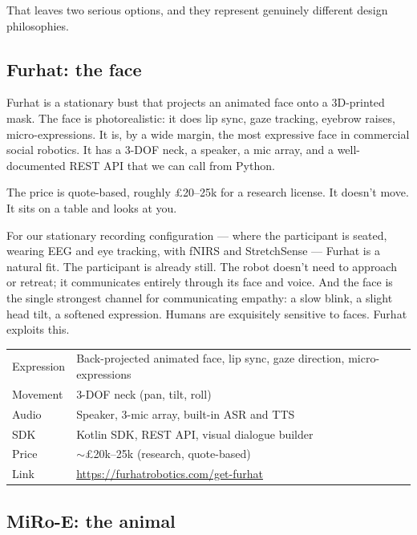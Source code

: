 \documentclass[11pt,a4paper]{article}
\begin{document}
That leaves two serious options, and they represent genuinely different design philosophies.

\subsection{Furhat: the face}

Furhat is a stationary bust that projects an animated face onto a 3D-printed mask. The face is photorealistic: it does lip sync, gaze tracking, eyebrow raises, micro-expressions. It is, by a wide margin, the most expressive face in commercial social robotics. It has a 3-DOF neck, a speaker, a mic array, and a well-documented REST API that we can call from Python.

The price is quote-based, roughly \pounds 20--25k for a research license. It doesn't move. It sits on a table and looks at you.

For our stationary recording configuration --- where the participant is seated, wearing EEG and eye tracking, with fNIRS and StretchSense --- Furhat is a natural fit. The participant is already still. The robot doesn't need to approach or retreat; it communicates entirely through its face and voice. And the face is the single strongest channel for communicating empathy: a slow blink, a slight head tilt, a softened expression. Humans are exquisitely sensitive to faces. Furhat exploits this.

\begin{table}[H]
\centering\small
\begin{tabularx}{\textwidth}{lX}
\toprule
Expression & Back-projected animated face, lip sync, gaze direction, micro-expressions \\
Movement & 3-DOF neck (pan, tilt, roll) \\
Audio & Speaker, 3-mic array, built-in ASR and TTS \\
SDK & Kotlin SDK, REST API, visual dialogue builder \\
Price & $\sim$\pounds 20k--25k (research, quote-based) \\
Link & \url{https://furhatrobotics.com/get-furhat} \\
\bottomrule
\end{tabularx}
\end{table}

\subsection{MiRo-E: the animal}
\end{document}
